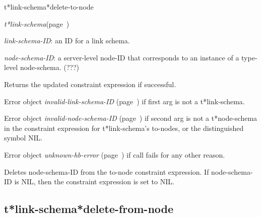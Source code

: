 \begin{description}
\item [Name:]  t*link-schema*delete-to-node

\item [Class:] {\sl t*link-schema}\hfill(page~\pageref{t*link-schema})

\item [Parameters:]
\item {\sl link-schema-ID}:  an ID for a link schema.

\item {\sl node-schema-ID}:  a server-level node-ID that corresponds to an 
instance of a type-level node-schema. (???)



\item [Return-value:]
Returns the updated constraint expression if successful.

Error object {\sl invalid-link-schema-ID} (page~\pageref{invalid-link-schema-ID}) if first
arg is not a t*link-schema.

Error object {\sl invalid-node-schema-ID} (page~\pageref{invalid-node-schema-ID}) if second
arg is not a t*node-schema in the constraint 
expression for t*link-schema's to-nodes, or the 
distinguished symbol NIL. 

Error object {\sl unknown-hb-error} (page~\pageref{unknown-hb-error}) if call fails
for any other reason.

\item [Description:]

Deletes node-schema-ID from the to-node constraint
expression. If node-schema-ID is NIL, then the 
constraint expression is set to NIL.

\item [Public:]



\end{description}
\horizontalline

\subsection{t*link-schema*delete-from-node}
\label{t*link-schema*delete-from-node}


